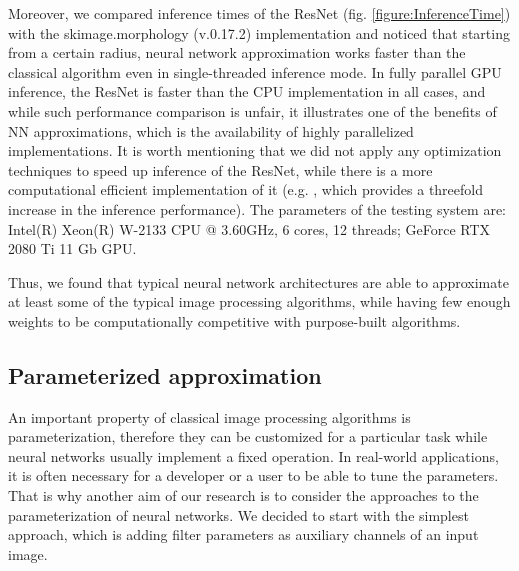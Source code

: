 Moreover, we compared inference times of the ResNet (fig.  \ref{figure:InferenceTime}) with the skimage.morphology (v.0.17.2) implementation and noticed that starting from a certain radius, neural network approximation works faster than the classical algorithm even in single-threaded inference mode.
In fully parallel GPU inference, the ResNet is faster than the CPU implementation in all cases, and while such performance comparison is unfair, it illustrates one of the benefits of NN approximations, which is the availability of highly parallelized implementations. 
It is worth mentioning that we did not apply any optimization techniques to speed up inference of the ResNet, while there is a more computational efficient implementation of it (e.g.  \cite{ResNetDetection}, which provides a threefold increase in the inference performance). The parameters of the testing system are: Intel(R) Xeon(R) W-2133 CPU @ 3.60GHz, 6 cores, 12 threads; GeForce RTX 2080 Ti 11 Gb GPU.

Thus, we found that typical neural network architectures are able to approximate at least some of the typical image processing algorithms, while having few enough weights to be computationally competitive with purpose-built algorithms. 


\subsection*{\textbf{Parameterized approximation}}

An important property of classical image processing algorithms is parameterization, therefore they can be customized for a particular task while neural networks usually implement a fixed operation. In real-world applications, it is often necessary for a developer or a user to be able to tune the parameters. That is why another aim of our research is to consider the approaches to the parameterization of neural networks. We decided to start with the simplest approach, which is adding filter parameters as auxiliary channels of an input image.  

